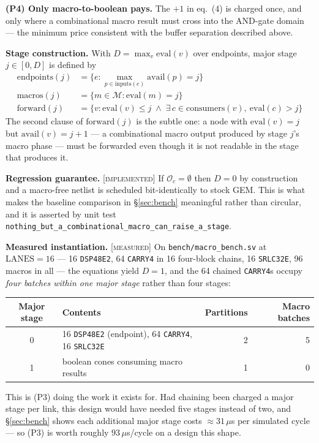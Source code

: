 \documentclass[11pt]{article}
\newcommand{\M}{\textcolor{blue!45!black}{\scriptsize\textsc{[measured]}}}
\newcommand{\I}{\textcolor{note}{\scriptsize\textsc{[implemented]}}}
\newcommand{\code}[1]{\texttt{\small #1}}
\begin{document}
\textbf{(P4) Only macro-to-boolean pays.} The $+1$ in eq.~(4) is charged once, and
only where a combinational macro result must cross into the AND-gate domain --- the
minimum price consistent with the buffer separation described above.

\textbf{Stage construction.} With $D = \max_v \mathrm{eval}(v)$ over endpoints, major
stage $j \in [0,D]$ is defined by
\begin{align}
\mathrm{endpoints}(j) &= \{e : \textstyle\max_{p \in \mathrm{inputs}(e)} \mathrm{avail}(p) = j\}\\
\mathrm{macros}(j) &= \{m \in \mathcal{M} : \mathrm{eval}(m) = j\}\\
\mathrm{forward}(j) &= \{v : \mathrm{eval}(v) \le j \;\wedge\; \exists\, c \in \mathrm{consumers}(v),\ \mathrm{eval}(c) > j\}
\end{align}
The second clause of $\mathrm{forward}(j)$ is the subtle one: a node with
$\mathrm{eval}(v)=j$ but $\mathrm{avail}(v)=j{+}1$ --- a combinational macro output
produced by stage $j$'s macro phase --- must be forwarded even though it is not
readable in the stage that produces it.

\textbf{Regression guarantee.} \I{} If $\mathcal{O}_c = \emptyset$ then $D=0$ by
construction and a macro-free netlist is scheduled bit-identically to stock GEM.
This is what makes the baseline comparison in \S\ref{sec:bench} meaningful rather
than circular, and it is asserted by unit test
\code{nothing\_but\_a\_combinational\_macro\_can\_raise\_a\_stage}.

\textbf{Measured instantiation.} \M{} On \code{bench/macro\_bench.sv} at
$\mathrm{LANES}=16$ --- 16 \code{DSP48E2}, 64 \code{CARRY4} in 16 four-block chains,
16 \code{SRLC32E}, 96 macros in all --- the equations yield $D=1$, and the 64 chained
\code{CARRY4}s occupy \emph{four batches within one major stage} rather than four
stages:

\begin{center}\small
\begin{tabular}{clrr}
\toprule
Major stage & Contents & Partitions & Macro batches\\
\midrule
0 & 16 \code{DSP48E2} (endpoint), 64 \code{CARRY4}, 16 \code{SRLC32E} & 2 & 5\\
1 & boolean cones consuming macro results & 1 & 0\\
\bottomrule
\end{tabular}
\end{center}

This is (P3) doing the work it exists for. Had chaining been charged a major stage
per link, this design would have needed five stages instead of two, and
\S\ref{sec:bench} shows each additional major stage costs $\approx 31\,\mu$s per
simulated cycle --- so (P3) is worth roughly $93\,\mu$s/cycle on a design this shape.
\end{document}

